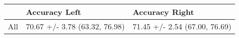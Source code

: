 \begin{tabular}{lll}
\toprule
{} &                  Accuracy Left &                 Accuracy Right \\
\midrule
All &  70.67 +/- 3.78 (63.32, 76.98) &  71.45 +/- 2.54 (67.00, 76.69) \\
\bottomrule
\end{tabular}
